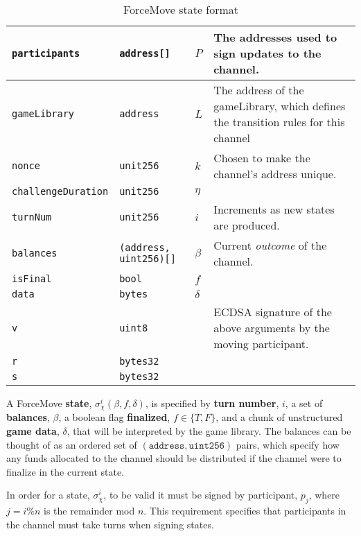 \begin{table}[h]
  \begin{tabular}{|l|l|l|p{5cm}|}
    \hline
    \texttt{participants} & \texttt{address[]} & $P$ & The addresses used to sign updates to the channel. \\ \hline
    \texttt{gameLibrary} & \texttt{address} & $L$ & The address of the gameLibrary, which defines the transition rules for this channel \\ \hline
    \texttt{nonce} & \texttt{unit256} & $k$ & Chosen to make the channel's address unique. \\ \hline
    \texttt{challengeDuration} & \texttt{unit256} & $\eta$ & \\ \hline
    \texttt{turnNum} & \texttt{unit256} & $i$ & Increments as new states are produced. \\ \hline
    \texttt{balances} & \texttt{(address, uint256)[]} & $\beta$ & Current \textit{outcome} of the channel. \\ \hline
    \texttt{isFinal} & \texttt{bool} & $f$ & \\ \hline
    \texttt{data} & \texttt{bytes} & $\delta$ & \\ \hline
    \texttt{v} & \texttt{uint8} & &  ECDSA signature of the above arguments by the moving participant. \\ \cline{1-2}
    \texttt{r} & \texttt{bytes32} & & \\ \cline{1-2}
    \texttt{s} & \texttt{bytes32} & & \\ \hline
  \end{tabular}
  \caption{ForceMove state format}
  \label{table:force-move-state}
\end{table}

A ForceMove \textbf{state}, $\sigma_\chi^i(\beta, f, \delta)$, is specified by \textbf{turn number}, $i$,
a set of \textbf{balances}, $\beta$, a boolean flag \textbf{finalized}, $f \in \{T, F\}$, and
a chunk of unstructured \textbf{game data}, $\delta$, that will be interpreted by the game library. The
balances can be thought of as an ordered set of $(\texttt{address}, \texttt{uint256})$ pairs,
which specify how any funds allocated to the channel should be distributed if the channel 
were to finalize in the current state.

In order for a state, $\sigma_\chi^i$, to be valid it must be signed by participant, $p_j$,
where $j = i \% n$ is the remainder mod $n$. This requirement specifies that participants
in the channel must take turns when signing states.

